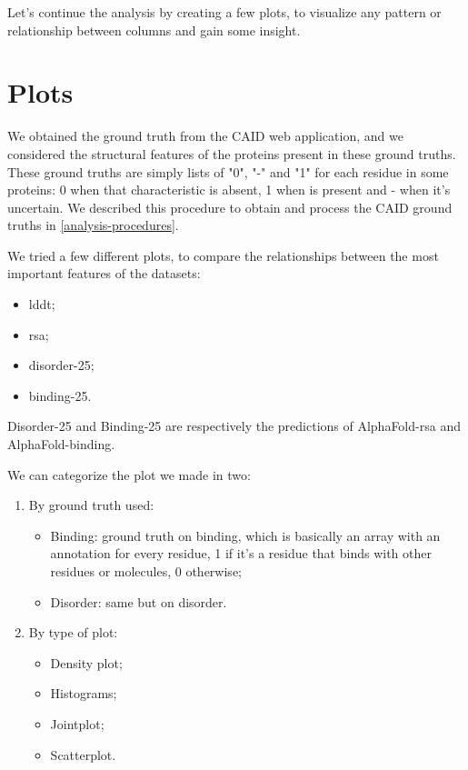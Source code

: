 Let's continue the analysis by creating a few plots, to visualize any pattern or relationship between columns and gain some insight.

\section{Plots}
We obtained the ground truth from the CAID web application, and we considered the structural features of the proteins present in these ground truths. These ground truths are simply lists of "0", "-" and "1" for each residue in some proteins: 0 when that characteristic is absent, 1 when is present and - when it's uncertain. We described this procedure to obtain and process the CAID ground truths in \ref{analysis-procedures}.

We tried a few different plots, to compare the relationships between the most important features of the datasets: 

\begin{itemize}
    \item lddt;
    \item rsa;
    \item disorder-25;
    \item binding-25.
\end{itemize}

Disorder-25 and Binding-25 are respectively the predictions of AlphaFold-rsa and AlphaFold-binding.

We can categorize the plot we made in two:

\begin{enumerate}
    \item By ground truth used:
        \begin{itemize}
            \item Binding: ground truth on binding, which is basically an array with an annotation for every residue, 1 if it's a residue that binds with other residues or molecules, 0 otherwise;
            \item Disorder: same but on disorder.
        \end{itemize}
    \item By type of plot:
        \begin{itemize}
            \item Density plot;
            \item Histograms;
            \item Jointplot;
            \item Scatterplot.
        \end{itemize}
\end{enumerate}

